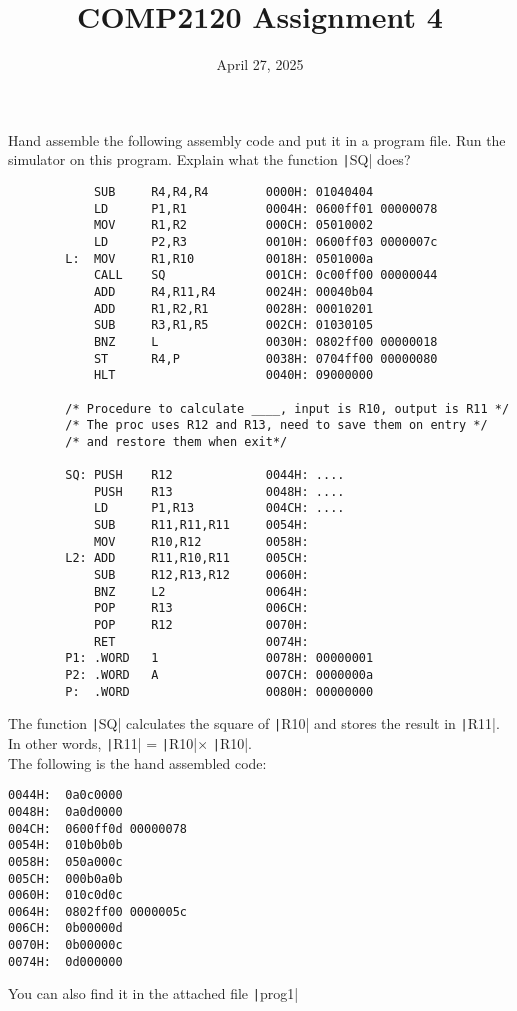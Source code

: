 \documentclass[answers]{exam}
\title{COMP2120 Assignment 4}
\date{April 27, 2025}
\begin{document}
\maketitle

\begin{questions}
    \question Hand assemble the following assembly code and put it in a program file. Run the simulator on this program. Explain what the function \texttt|SQ| does?
    \begin{listing}[htb]
        \begin{verbatim}
            SUB     R4,R4,R4        0000H: 01040404
            LD      P1,R1           0004H: 0600ff01 00000078
            MOV     R1,R2           000CH: 05010002
            LD      P2,R3           0010H: 0600ff03 0000007c
        L:  MOV     R1,R10          0018H: 0501000a
            CALL    SQ              001CH: 0c00ff00 00000044
            ADD     R4,R11,R4       0024H: 00040b04
            ADD     R1,R2,R1        0028H: 00010201
            SUB     R3,R1,R5        002CH: 01030105
            BNZ     L               0030H: 0802ff00 00000018
            ST      R4,P            0038H: 0704ff00 00000080
            HLT                     0040H: 09000000
        
        /* Procedure to calculate ____, input is R10, output is R11 */
        /* The proc uses R12 and R13, need to save them on entry */
        /* and restore them when exit*/
        
        SQ: PUSH    R12             0044H: ....
            PUSH    R13             0048H: ....
            LD      P1,R13          004CH: ....
            SUB     R11,R11,R11     0054H:
            MOV     R10,R12         0058H:
        L2: ADD     R11,R10,R11     005CH:
            SUB     R12,R13,R12     0060H:
            BNZ     L2              0064H:
            POP     R13             006CH:
            POP     R12             0070H:
            RET                     0074H:
        P1: .WORD   1               0078H: 00000001
        P2: .WORD   A               007CH: 0000000a
        P:  .WORD                   0080H: 00000000
        \end{verbatim}
    \end{listing}

    \pagebreak
    \begin{solution}
        The function \texttt|SQ| calculates the square of \texttt|R10| and stores the result in \texttt|R11|. \\
        In other words, \texttt|R11| = \texttt|R10|$\times$ \texttt|R10|. \\
        The following is the hand assembled code:
        \begin{verbatim}
0044H:  0a0c0000
0048H:  0a0d0000
004CH:  0600ff0d 00000078
0054H:  010b0b0b
0058H:  050a000c
005CH:  000b0a0b
0060H:  010c0d0c
0064H:  0802ff00 0000005c
006CH:  0b00000d
0070H:  0b00000c
0074H:  0d000000
        \end{verbatim}
        You can also find it in the attached file \texttt|prog1|
    \end{solution}



\end{questions}
\end{document}
